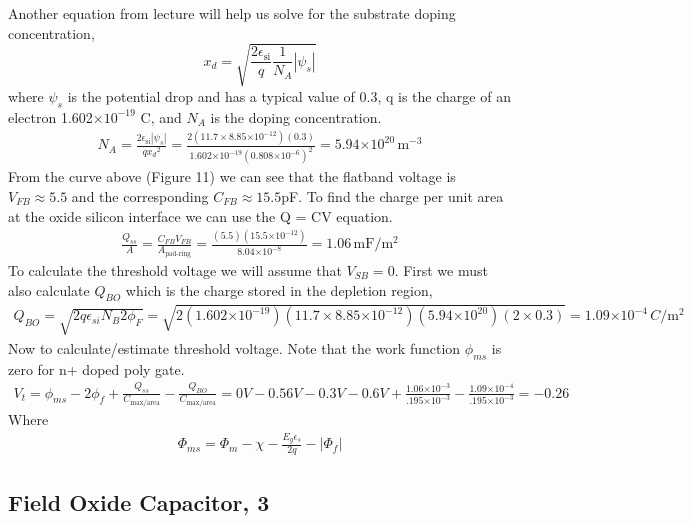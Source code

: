 \documentclass{article}
\providecommand{\e}[1]{\ensuremath{\times 10^{#1}}}
\begin{document}
Another equation from lecture will help us solve for the substrate doping concentration,
\begin{equation}
x_d = \sqrt{\frac{2\epsilon_{\text{si}}}{q}\frac{1}{N_A}|\psi_s|}
\end{equation}
where $\psi_s$ is the potential drop and has a typical value of 0.3, q is the charge of an electron 1.602\e{-19} C, and $N_A$ is the doping concentration.
\begin{align*}
N_A = \frac{2\epsilon_{\text{si}} |\psi_s|}{q{x_d}^2} = \frac{2(11.7 \times 8.85\e{-12})(0.3)}{1.602\e{-19}(0.808\e{-6})^2} = 5.94\e{20} \,{\text{m}}^{-3}
\end{align*}
From the curve above (Figure 11) we can see that the flatband voltage is $V_{FB} \approx 5.5$ and the corresponding $C_{FB} \approx 15.5$pF. To find the charge per unit area at the oxide silicon interface we can use the Q = CV equation.
\begin{align*}
\frac{Q_{ss}}{A} = \frac{C_{FB}V_{FB}}{A_{\text{pad-ring}}} = \frac{(5.5)(15.5\e{-12})}{8.04\e{-8}} = 1.06 \,\text{mF}/\text{m}^2
\end{align*}
To calculate the threshold voltage we will assume that $V_{SB} = 0$. First we must also calculate $Q_{BO}$ which is the charge stored in the depletion region,
\begin{align*}
Q_{BO} = \sqrt{2q\epsilon_{si}N_B2\phi_F} = \sqrt{2(1.602\e{-19})(11.7 \times 8.85\e{-12})(5.94\e{20})(2 \times 0.3)} = 1.09\e{-4}\, C/{\text{m}}^2
\end{align*}
Now to calculate/estimate threshold voltage. Note that the work function $\phi_{ms}$ is zero for n+ doped poly gate.
\begin{align*}
V_t = \phi_{ms} - 2\phi_f + \frac{Q_{ss}}{C_{\text{max/area}}} - \frac{Q_{BO}}{C_{\text{max/area}}} = 0V -0.56V -0.3V - 0.6V + \frac{1.06\e{-3}}{.195\e{-3}} - \frac{1.09\e{-4}}{.195\e{-3}} = -0.26
\end{align*}
Where
\begin{align*}
\Phi_{ms} = \Phi_{m} - \chi - \frac{E_{g}\epsilon_{s}}{2q} - |\Phi_f| 
\end{align*}

\subsection{Field Oxide Capacitor, 3} %
\end{document}

